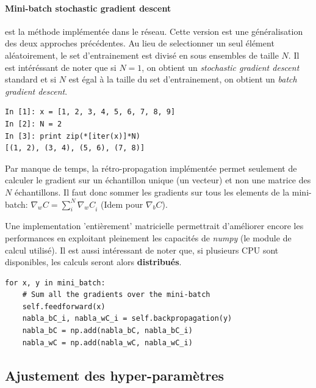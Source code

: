 \documentclass[11pt]{article}
\begin{document}
\paragraph{Mini-batch stochastic gradient descent} est la m\'ethode impl\'ement\'ee
dans le r\'eseau. Cette version est une g\'en\'eralisation des deux approches
pr\'ec\'edentes. Au lieu de selectionner un seul \'el\'ement al\'eatoirement,
le set d'entrainement est divis\'e en sous ensembles de taille $N$. Il est
int\'er\'essant de noter que si $N=1$, on obtient un {\em stochastic gradient descent}
standard et si $N$ est \'egal \`a la taille du set d'entrainement, on obtient un
{\em batch gradient descent}.

\begin{lstlisting}
In [1]: x = [1, 2, 3, 4, 5, 6, 7, 8, 9]
In [2]: N = 2
In [3]: print zip(*[iter(x)]*N)
[(1, 2), (3, 4), (5, 6), (7, 8)]
\end{lstlisting}

Par manque de temps, la r\'etro-propagation impl\'ement\'ee permet seulement de
calculer le gradient sur un \'echantillon unique (un vecteur) et non une matrice
des $N$ \'echantillons. Il faut donc sommer les gradients sur tous les elements de
la mini-batch:
$
		\nabla_wC = \sum_{i}^{N}{{\nabla_wC}_i}
$ (Idem pour $\nabla_bC$).

Une implementation 'enti\`erement' matricielle permettrait d'am\'eliorer encore
les performances en exploitant pleinement les capacit\'es de \emph{numpy}
(le module de calcul utilis\'e). Il est aussi int\'eressant de noter que,
si plusieurs CPU sont disponibles, les calculs seront alors {\bf distribu\'es}.
\begin{lstlisting}
for x, y in mini_batch:
	# Sum all the gradients over the mini-batch
	self.feedforward(x)
	nabla_bC_i, nabla_wC_i = self.backpropagation(y)
	nabla_bC = np.add(nabla_bC, nabla_bC_i)
	nabla_wC = np.add(nabla_wC, nabla_wC_i)
\end{lstlisting}

\newpage
\subsection{Ajustement des hyper-param\`etres}
\end{document}

